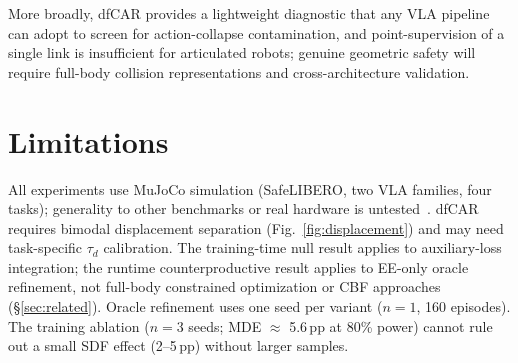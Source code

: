 More broadly, dfCAR provides a lightweight diagnostic that any VLA pipeline can adopt to screen for action-collapse contamination, and point-supervision of a single link is insufficient for articulated robots; genuine geometric safety will require full-body collision representations and cross-architecture validation.

\section{Limitations}\label{sec:limitations}

All experiments use MuJoCo simulation (SafeLIBERO, two VLA families, four tasks); generality to other benchmarks or real hardware is untested~\cite{zhao2020simtoreal}. dfCAR requires bimodal displacement separation (Fig.~\ref{fig:displacement}) and may need task-specific $\tau_d$ calibration. The training-time null result applies to auxiliary-loss integration; the runtime counterproductive result applies to EE-only oracle refinement, not full-body constrained optimization or CBF approaches (\S\ref{sec:related}). Oracle refinement uses one seed per variant ($n{=}1$, 160 episodes). The training ablation ($n{=}3$ seeds; MDE ${\approx}$ 5.6\,pp at 80\% power) cannot rule out a small SDF effect (2--5\,pp) without larger samples.
